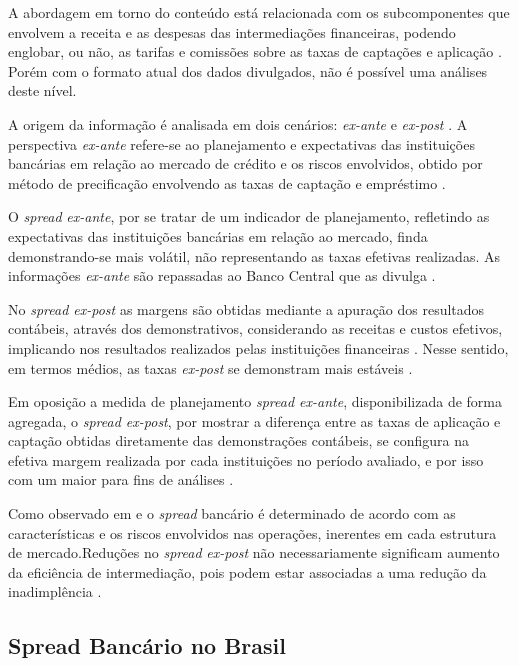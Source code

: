 \documentclass[
  12pt,
  12pt,
  openright,
  oneside,
  a4paper,
  chapter=TITLE,
  section=TITLE,
  subsection=TITLE,
  subsubsection=TITLE,
  english,
  portugues,
  sumario=tradicional]{abntex2}
\begin{document}
A abordagem em torno do conteúdo está relacionada com os subcomponentes que envolvem a receita e as despesas das intermediações financeiras, podendo englobar, ou não, as tarifas e comissões sobre as taxas de captações e aplicação \cite{block:2000}. Porém com o formato atual dos dados divulgados, não é possível uma análises deste nível.

A origem da informação é analisada em dois cenários: \emph{ex-ante} e \emph{ex-post} \cite{kunt:1999, levine:1997}. A perspectiva \emph{ex-ante} refere-se ao planejamento e expectativas das instituições bancárias em relação ao mercado de crédito e os riscos envolvidos, obtido por método de precificação envolvendo as taxas de captação e empréstimo \cite{durigan:2018, leal:2006, dantas:2012}.

O \emph{spread} \emph{ex-ante}, por se tratar de um indicador de planejamento, refletindo as expectativas das instituições bancárias em relação ao mercado, finda demonstrando-se mais volátil, não representando as taxas efetivas realizadas. As informações \emph{ex-ante} são repassadas ao Banco Central que as divulga \cite{durigan:2018, leal:2006, dantas:2012}.

No \emph{spread ex-post} as margens são obtidas mediante a apuração dos resultados contábeis, através dos demonstrativos, considerando as receitas e custos efetivos, implicando nos resultados realizados pelas instituições financeiras \cite{kunt:1999, durigan:2018}. Nesse sentido, em termos médios, as taxas \emph{ex-post} se demonstram mais estáveis \cite{leal:2006, dantas:2012}.

Em oposição a medida de planejamento \emph{spread ex-ante}, disponibilizada de forma agregada, o \emph{spread ex-post}, por mostrar a diferença entre as taxas de aplicação e captação obtidas diretamente das demonstrações contábeis, se configura na efetiva margem realizada por cada instituições no período avaliado, e por isso com um maior para fins de análises \cite{dantas:2012}.

Como observado em \textcite{klein:1971} e \textcite{ho-saunders:1981} o \emph{spread} bancário é determinado de acordo com as características e os riscos envolvidos nas operações, inerentes em cada estrutura de mercado.Reduções no \emph{spread} \emph{ex-post} não necessariamente significam aumento da eficiência de intermediação, pois podem estar associadas a uma redução da inadimplência \cite{kunt:1999}.

\subsection{Spread Bancário no Brasil}
\end{document}
